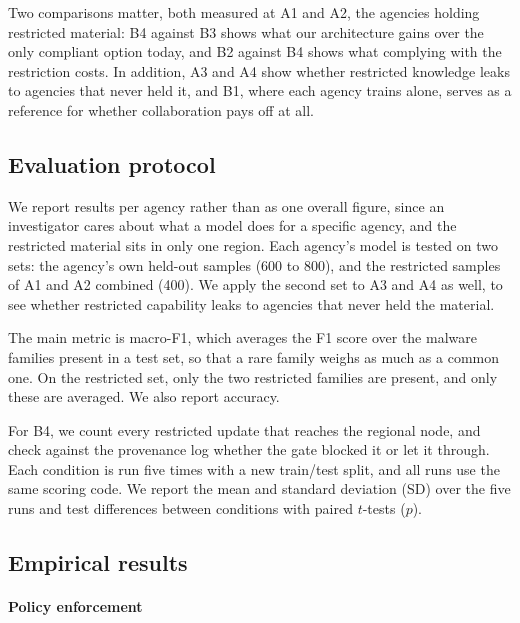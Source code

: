 Two comparisons matter, both measured at A1 and A2, the agencies holding restricted material: B4 against B3 shows what our architecture gains over the only compliant option today, and B2 against B4 shows what complying with the restriction costs. In addition, A3 and A4 show whether restricted knowledge leaks to agencies that never held it, and B1, where each agency trains alone, serves as a reference for whether collaboration pays off at all.



\subsection{Evaluation protocol}
\label{sec:protocol}

We report results per agency rather than as one overall figure, since an investigator cares about what a model does for a specific agency, and the restricted material sits in only one region. Each agency's model is tested on two sets: the agency's own held-out samples (600 to 800), and the restricted samples of A1 and A2 combined (400). We apply the second set to A3 and A4 as well, to see whether restricted capability leaks to agencies that never held the material.

The main metric is macro-F1, which averages the F1 score over the malware families present in a test set, so that a rare family weighs as much as a common one. On the restricted set, only the two restricted families are present, and only these are averaged. We also report accuracy.

For B4, we count every restricted update that reaches the regional node, and check against the provenance log whether the gate blocked it or let it through. Each condition is run five times with a new train/test split, and all runs use the same scoring code. We report the mean and standard deviation (SD) over the five runs and test differences between conditions with paired $t$-tests ($p$).
\\




\subsection{Empirical results}
\label{subsec:empirical_results}




\paragraph{Policy enforcement}

